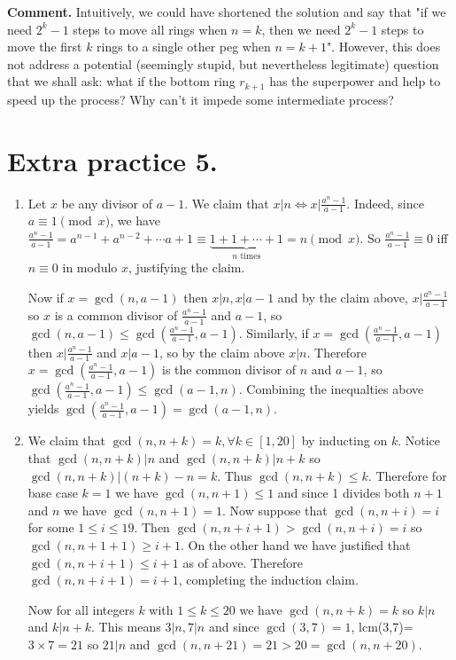 \documentclass[11pt]{article}
\begin{document}
\begin{enumerate}
\textbf {Comment.} Intuitively, we could have shortened the solution and say that "if we need $2^k-1$ steps to move all rings when $n=k$, then we need $2^k-1$ steps to move the first $k$ rings to a single other peg when $n=k+1$". However, this does not address a potential (seemingly stupid, but nevertheless legitimate) question that we shall ask: what if the bottom ring $r_{k+1}$ has the superpower and help to speed up the process? Why can't it impede some intermediate process?

\end{enumerate}

\section{Extra practice 5.}
\begin{enumerate}
\item Let $x$ be any divisor of $a-1$. We claim that $x|n\Leftrightarrow x|\frac{a^n-1}{a-1}$. Indeed, since $a\equiv 1\pmod {x}$, we have $\frac{a^n-1}{a-1}=a^{n-1}+a^{n-2}+\cdots a+1\equiv \underbrace{1+1+\cdots +1}_{\text {$n$ times}}=n\pmod {x}$. So $\frac{a^n-1}{a-1}\equiv 0$ iff $n\equiv 0$ in modulo $x$, justifying the claim.

Now if $x=\gcd (n, a-1)$ then $x|n, x|a-1$ and by the claim above, $x|\frac{a^n-1}{a-1}$ so $x$ is a common divisor of $\frac{a^n-1}{a-1}$ and $a-1$, so $\gcd (n, a-1)\le\gcd (\frac{a^n-1}{a-1}, a-1).$ Similarly, if $x=\gcd (\frac{a^n-1}{a-1}, a-1)$ then $x|\frac{a^n-1}{a-1}$ and $x|a-1$, so by the claim above $x|n$. Therefore $x=\gcd (\frac{a^n-1}{a-1}, a-1)$ is the common divisor of $n$ and $a-1$, so $\gcd (\frac{a^n-1}{a-1}, a-1)\le \gcd(a-1, n)$. Combining the inequalties above yields $\gcd (\frac{a^n-1}{a-1}, a-1)= \gcd(a-1, n)$.

\item We claim that $\gcd (n,n+k)=k, \forall k\in [1,20]$ by inducting on $k$. Notice that $\gcd (n,n+k)|n$ and $\gcd (n,n+k)|n+k$ so $\gcd (n,n+k)|(n+k)-n=k$. Thus $\gcd (n,n+k)\le k.$ Therefore for base case $k=1$ we have $\gcd (n,n+1)\le 1$ and since 1 divides both $n+1$ and $n$ we have $\gcd (n, n+1)=1$. Now suppose that $\gcd (n, n+i)=i$ for some $1\le i\le 19$. Then $\gcd (n,n+i+1)>\gcd(n,n+i)=i$ so $\gcd (n,n+1+1)\ge i+1$. On the other hand we have justified that $\gcd (n,n+i+1)\le i+1$ as of above. Therefore $\gcd (n, n+i+1)=i+1$, completing the induction claim.

Now for all integers $k$ with $1\le k\le 20$ we have $\gcd (n,n+k)=k$ so $k|n$ and $k|n+k$. This means $3|n, 7|n$ and since $\gcd (3,7)=1$, lcm(3,7)=$3\times 7=21$ so $21|n$ and $\gcd (n, n+21)=21>20=\gcd (n, n+20)$. 


\end{enumerate}
\end{document}
